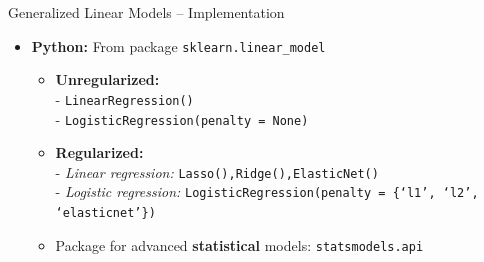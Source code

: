 \documentclass[11pt,compress,t,notes=noshow, xcolor=table]{beamer}
\newcommand{\highlight}[1]{\textcolor{hlcol}{\textbf{#1}}}
\begin{document}
\begin{frame2}{Generalized Linear Models -- Implementation}
\begin{itemize}
  \item \textbf{Python:} From package \texttt{sklearn.linear\_model} 
  \begin{itemize}
    \item \textbf{Unregularized:}\\ 
    - \texttt{LinearRegression()}\\
    - \texttt{LogisticRegression(penalty = None)}
    \item \textbf{Regularized:}\\
    - \textit{Linear regression:} \texttt{Lasso(),Ridge(),ElasticNet()} \\
    - \textit{Logistic regression:} \texttt{LogisticRegression(penalty = \{‘l1’, ‘l2’, ‘elasticnet’\})}
    \item Package for advanced \textbf{statistical} models: \texttt{statsmodels.api} 
  \end{itemize}
\end{itemize}

  
\end{frame2}
\end{document}
